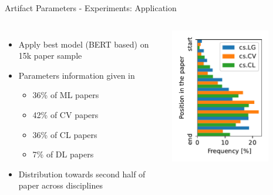\documentclass[en,16:9,smallfoot]{sdqbeamer}
\begin{document}
   \begin{frame}{Artifact Parameters - Experiments: Application}
   \begin{columns}
        \vspace{-1.5em}
        \begin{itemize}
        \item Apply best model (BERT based) on 15k paper sample
        \item Parameters information given in
        \begin{itemize}
            \item 36\% of ML papers
            \item 42\% of CV papers
            \item 36\% of CL papers
            \item 7\% of DL papers
        \end{itemize}
        \item Distribution towards second half of paper across disciplines
        \end{itemize}
          \centering
           \includegraphics[width=0.75\textwidth]{imgs/hyperparam_pos}
   \end{columns}
   \end{frame}
\end{document}
